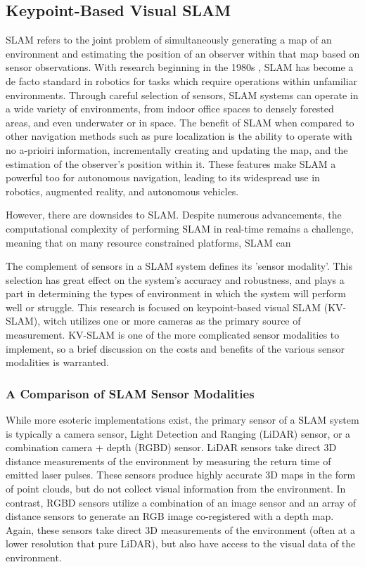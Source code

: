 \subsection{Keypoint-Based Visual SLAM}

SLAM refers to the joint problem of simultaneously generating a map of an environment and estimating the position of an observer within that map based on sensor observations. With research beginning in the 1980s \cite{smithEstimatingUncertainSpatial1988}, SLAM has become a de facto standard in robotics for tasks which require operations within unfamiliar environments. Through careful selection of sensors, SLAM systems can operate in a wide variety of environments, from indoor office spaces to densely forested areas, and even underwater or in space. The benefit of SLAM when compared to other navigation methods such as pure localization is the ability to operate with no a-prioiri information, incrementally creating and updating the map, and the estimation of the observer's position within it. These features make SLAM a powerful too for autonomous navigation, leading to its widespread use in robotics, augmented reality, and autonomous vehicles.

However, there are downsides to SLAM. Despite numerous advancements, the computational complexity of performing SLAM in real-time remains a challenge, meaning that on many resource constrained platforms, SLAM can 

The complement of sensors in a SLAM system defines its 'sensor modality'. This selection has great effect on the system's accuracy and robustness, and plays a part in determining the types of environment in which the system will perform well or struggle. This research is focused on keypoint-based visual SLAM (KV-SLAM), witch utilizes one or more cameras as the primary source of measurement. KV-SLAM is one of the more complicated sensor modalities to implement, so a brief discussion on the costs and benefits of the various sensor modalities is warranted.

\subsubsection{A Comparison of SLAM Sensor Modalities}

While more esoteric implementations exist, the primary sensor of a SLAM system is typically a camera sensor, Light Detection and Ranging (LiDAR) sensor, or a combination camera + depth (RGBD) sensor. LiDAR sensors take direct 3D distance measurements of the environment by measuring the return time of emitted laser pulses. These sensors produce highly accurate 3D maps in the form of point clouds, but do not collect visual information from the environment. In contrast, RGBD sensors utilize a combination of an image sensor and an array of distance sensors to generate an RGB image co-registered with a depth map. Again, these sensors take direct 3D measurements of the environment (often at a lower resolution that pure LiDAR), but also have access to the visual data of the environment.

